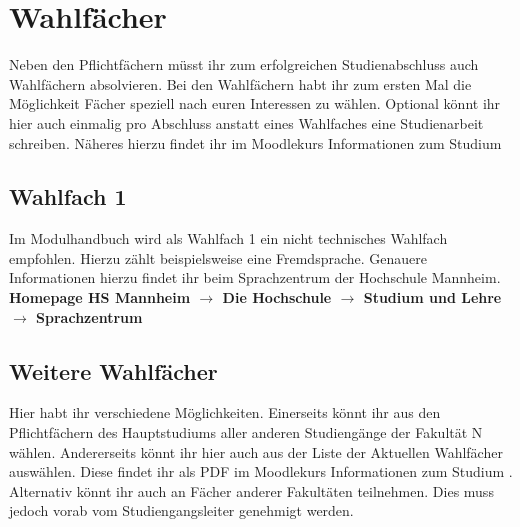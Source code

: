 \chapter{Wahlfächer}
Neben den Pflichtfächern müsst ihr zum erfolgreichen Studienabschluss auch Wahlfächern absolvieren.
Bei den Wahlfächern habt ihr zum ersten Mal die Möglichkeit Fächer speziell nach euren Interessen zu wählen.
Optional könnt ihr hier auch einmalig pro Abschluss anstatt eines Wahlfaches eine Studienarbeit schreiben.
Näheres hierzu findet ihr im Moodlekurs \glqq Informationen zum Studium \grqq   

\section{Wahlfach 1}
Im Modulhandbuch wird als Wahlfach 1 ein nicht technisches Wahlfach empfohlen.
Hierzu zählt beispielsweise eine Fremdsprache. Genauere Informationen hierzu findet ihr beim Sprachzentrum 
der Hochschule Mannheim.\\ 
\textbf{Homepage HS Mannheim \(\rightarrow\) Die Hochschule \(\rightarrow\) 
Studium und Lehre \(\rightarrow\) Sprachzentrum}

\section{Weitere Wahlfächer}
Hier habt ihr verschiedene Möglichkeiten. Einerseits könnt ihr aus den Pflichtfächern des Hauptstudiums 
aller anderen Studiengänge der Fakultät N wählen. Andererseits könnt ihr hier auch aus der Liste der Aktuellen
Wahlfächer auswählen. Diese findet ihr als PDF im Moodlekurs \glqq Informationen zum Studium \grqq.
Alternativ könnt ihr auch an Fächer anderer Fakultäten teilnehmen. Dies muss jedoch vorab vom
Studiengangsleiter genehmigt werden.  

